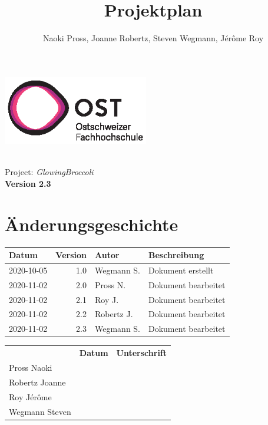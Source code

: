 \documentclass[a4paper, twosided, 11pt]{scrartcl}
\title{Projektplan}
\author{Naoki Pross, Joanne Robertz, Steven Wegmann, J\'er\^ome Roy}
\begin{document}
\begin{titlepage}
  \includegraphics[height=3cm]{pic/ost-logo}
  \begin{flushright}
    \vspace{5cm}
    {\Huge \bfseries \thetitle} \\
    \vspace{5mm}
    {\LARGE Project: \textit{GlowingBroccoli}} \\
    \vspace{5mm}
    {\LARGE \bfseries Version 2.3}
  \end{flushright}
\end{titlepage}


\clearpage
\section*{\"Anderungsgeschichte}
\begin{tabularx}{\textwidth}{lrlX}
  \toprule
  \bfseries Datum & \bfseries Version & \bfseries Autor & \bfseries Beschreibung \\
  \midrule
  2020-10-05 & 1.0 & Wegmann S. & Dokument erstellt \\
  2020-11-02 & 2.0 & Pross N.   & Dokument bearbeitet \\
  2020-11-02 & 2.1 & Roy J.     & Dokument bearbeitet \\
  2020-11-02 & 2.2 & Robertz J. & Dokument bearbeitet \\
  2020-11-02 & 2.3 & Wegmann S. & Dokument bearbeitet \\
  \bottomrule
\end{tabularx}

\vfill
{
  \renewcommand{\arraystretch}{2}
  \begin{tabularx}{\textwidth}{lp{}X}
                   & \bfseries Datum & \bfseries Unterschrift \\
    Pross Naoki    & \hrulefill & \hrulefill \\
    Robertz Joanne & \hrulefill & \hrulefill \\
    Roy J\'er\^ome & \hrulefill & \hrulefill \\
    Wegmann Steven & \hrulefill & \hrulefill \\
  \end{tabularx}
}
\end{document}
